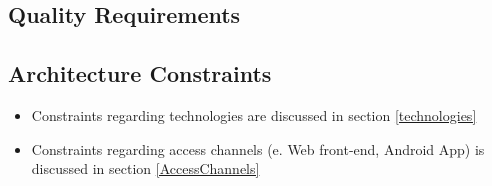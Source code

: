 
\subsection{Quality Requirements}
	
	
\subsection{Architecture Constraints}
\begin{itemize}
\item Constraints regarding technologies are discussed in section \ref{technologies}
\item Constraints regarding access channels (e. Web front-end, Android App) is discussed in section \ref{AccessChannels}
\end{itemize}